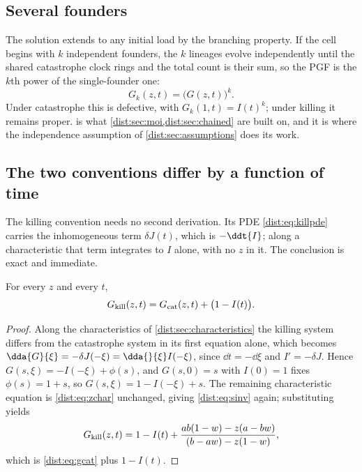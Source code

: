 \subsection{Several founders}
\label{dist:sec:pgf-k-founders}

The solution extends to any initial load by the branching property. If the
cell begins with $k$ independent founders, the $k$ lineages evolve
independently until the shared catastrophe clock rings and the total count is
their sum, so the PGF is the $k$th power of the single-founder one:
\begin{equation}
G_k(z,t) = \bigl(G(z,t)\bigr)^k .
\label{dist:eq:gk}
\end{equation}
Under catastrophe this is defective, with $G_k(1,t)=I(t)^k$; under killing it
remains proper.  is what
\cref{dist:sec:moi,dist:sec:chained} are built on, and it is where the
independence assumption of \cref{dist:sec:assumptions} does its work.

\subsection{The two conventions differ by a function of time}
\label{dist:sec:conventions}

The killing convention needs no second derivation. Its PDE
\cref{dist:eq:killpde} carries the inhomogeneous term $\delta J(t)$, which is
$-\ddt{I}$; along a characteristic that term integrates to $I$ alone, with no
$z$ in it. The conclusion is exact and immediate.

\begin{proposition}
\label{dist:prop:conventions}
For every $z$ and every $t$,
\begin{equation}
G_{\rm kill}(z,t)=G_{\rm cat}(z,t)+\bigl(1-I(t)\bigr).
\label{dist:eq:conventions}
\end{equation}
\end{proposition}

\begin{proof}
Along the characteristics of \cref{dist:sec:characteristics} the killing
system differs from the catastrophe system in its first equation alone, which
becomes $\dda{G}{\xi}=-\delta J(-\xi)=\dda{}{\xi}I(-\xi)$, since
$\dd t=-\dd\xi$ and $I'=-\delta J$. Hence $G(s,\xi)=-I(-\xi)+\phi(s)$, and
$G(s,0)=s$ with $I(0)=1$ fixes $\phi(s)=1+s$, so $G(s,\xi)=1-I(-\xi)+s$. The
remaining characteristic equation is \cref{dist:eq:zchar} unchanged, giving
\cref{dist:eq:sinv} again; substituting yields
\begin{equation}
G_{\rm kill}(z,t)=1-I(t)+\frac{ab(1-w)-z(a-bw)}{(b-aw)-z(1-w)},
\label{dist:eq:gkill}
\end{equation}
which is \cref{dist:eq:gcat} plus $1-I(t)$.
\end{proof}

